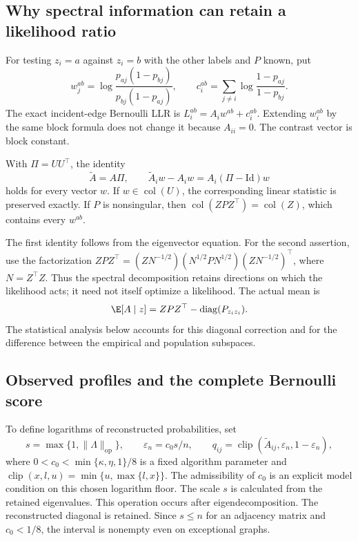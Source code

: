 \subsection{Why spectral information can retain a likelihood ratio}
For testing $z_i=a$ against $z_i=b$ with the other labels and $P$ known, put
\begin{equation}
 w_j^{ab}=\log\frac{p_{aj}(1-p_{bj})}{p_{bj}(1-p_{aj})},\qquad
 c_i^{ab}=\sum_{j\ne i}\log\frac{1-p_{aj}}{1-p_{bj}}.
 \label{eq:oracle-contrast}
\end{equation}
The exact incident-edge Bernoulli LLR is $L_i^{ab}=A_iw^{ab}+c_i^{ab}$. Extending $w_i^{ab}$ by the same block formula does not change it because $A_{ii}=0$. The contrast vector is block constant.

\begin{proposition}
\label{prop:exact-preservation}
With $\Pi=UU^\top$, the identity
\begin{equation}
 \widetilde A=A\Pi,\qquad
 \widetilde A_iw-A_iw=A_i(\Pi-\mathrm{Id})w
 \label{eq:projection-identity}
\end{equation}
holds for every vector $w$. If $w\in\operatorname{col}(U)$, the corresponding linear statistic is preserved exactly. If $P$ is nonsingular, then $\operatorname{col}(ZPZ^\top)=\operatorname{col}(Z)$, which contains every $w^{ab}$.
\end{proposition}

The first identity follows from the eigenvector equation. For the second assertion, use the factorization
$ZPZ^\top=(ZN^{-1/2})(N^{1/2}PN^{1/2})(ZN^{-1/2})^\top$, where $N=Z^\top Z$. Thus the spectral decomposition retains directions on which the likelihood acts; it need not itself optimize a likelihood. The actual mean is
\begin{equation}
 \E[A\mid z]=ZPZ^\top-\operatorname{diag}(P_{z_i z_i}).
 \label{eq:mean}
\end{equation}
The statistical analysis below accounts for this diagonal correction and for the difference between the empirical and population subspaces.

\subsection{Observed profiles and the complete Bernoulli score}
To define logarithms of reconstructed probabilities, set
\begin{equation}
 s=\max\{1,\|\Lambda\|_{\mathrm{op}}\},\qquad
 \varepsilon_n=c_0s/n,\qquad
 q_{ij}=\operatorname{clip}(\widetilde A_{ij},\varepsilon_n,1-\varepsilon_n),
 \label{eq:profiles}
\end{equation}
where $0<c_0<\min\{\kappa,\eta,1\}/8$ is a fixed algorithm parameter and $\operatorname{clip}(x,l,u)=\min\{u,\max\{l,x\}\}$. The admissibility of $c_0$ is an explicit model condition on this chosen logarithm floor. The scale $s$ is calculated from the retained eigenvalues. This operation occurs after eigendecomposition. The reconstructed diagonal is retained. Since $s\le n$ for an adjacency matrix and $c_0<1/8$, the interval is nonempty even on exceptional graphs.

